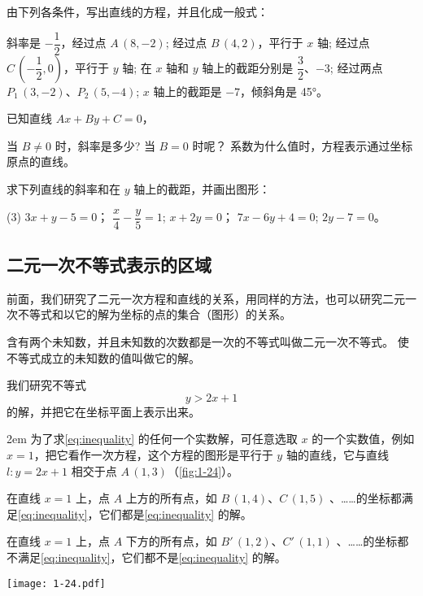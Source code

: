 \begin{Practice}
  \begin{question}
    \item 由下列各条件，写出直线的方程，并且化成一般式：
    \begin{tasks}
      \task 斜率是 $-\dfrac{1}{2}$，经过点 $A\,(8,-2)$;
      \task 经过点 $B\,(4,2)$，平行于 $x$ 轴;
      \task 经过点 $C\,(-\dfrac{1}{2},0)$，平行于 $y$ 轴;
      \task 在 $x$ 轴和 $y$ 轴上的截距分别是 $\dfrac{3}{2}$、$-3$;
      \task 经过两点 $P_1\,(3,-2)$、$P_2\,(5,- 4)$;
      \task $x$ 轴上的截距是 $-7$，倾斜角是 \ang{45}。
    \end{tasks}
    \item 已知直线 $Ax+By+C=0$，
    \begin{tasks}
      \task 当 $B\neq 0$ 时，斜率是多少? 当 $B = 0$ 时呢？
      \task 系数为什么值时，方程表示通过坐标原点的直线。
    \end{tasks}
    \item 求下列直线的斜率和在 $y$ 轴上的截距，并画出图形：
    \begin{tasks}(3)
      \task $3x+y-5=0$；
      \task $\dfrac{x}{4}-\dfrac{y}{5}=1$;
      \task $x+2y= 0$；
      \task $7x-6y+4=0$;
      \task $2y-7= 0$。
    \end{tasks}
  \end{question}
\end{Practice}

\subsection{二元一次不等式表示的区域}
前面，我们研究了二元一次方程和直线的关系，用同样的方法，也可以研究二元一次不等式和以它的解为坐标的点的集合（图形）的关系。

含有两个未知数，并且未知数的次数都是一次的不等式叫做二元一次不等式。
使不等式成立的未知数的值叫做它的解。

我们研究不等式
\begin{equation}
  \label{eq:inequality}
  y > 2x + 1
\end{equation}
的解，并把它在坐标平面上表示出来。

\medskip\noindent
\begin{minipage}{0.65\linewidth}\parindent2em
  为了求\cref{eq:inequality} 的任何一个实数解，可任意选取 $x$ 的一个实数值，例如 $x=1$，把它看作一次方程，这个方程的图形是平行于 $y$ 轴的直线，它与直线 $l:y=2x+ 1$ 相交于点 $A\,(1,3)$（\cref{fig:1-24}）。

  在直线 $x=1$ 上，点 $A$ 上方的所有点，如 $B\,(1,4)$、$C\,(1,5)$ 、……的坐标都满足\cref{eq:inequality}，它们都是\cref{eq:inequality} 的解。
  
  在直线 $x=1$ 上，点 $A$ 下方的所有点，如 $B'\,(1,2)$、$C'\,(1,1)$ 、……的坐标都不满足\cref{eq:inequality}，它们都不是\cref{eq:inequality} 的解。
\end{minipage}\hfill
\begin{minipage}{0.3\linewidth}\centering
\begin{figurehere}
  \texttt{[image: 1-24.pdf]}
  \caption{}\label{fig:1-24}
\end{figurehere}
\end{minipage}

